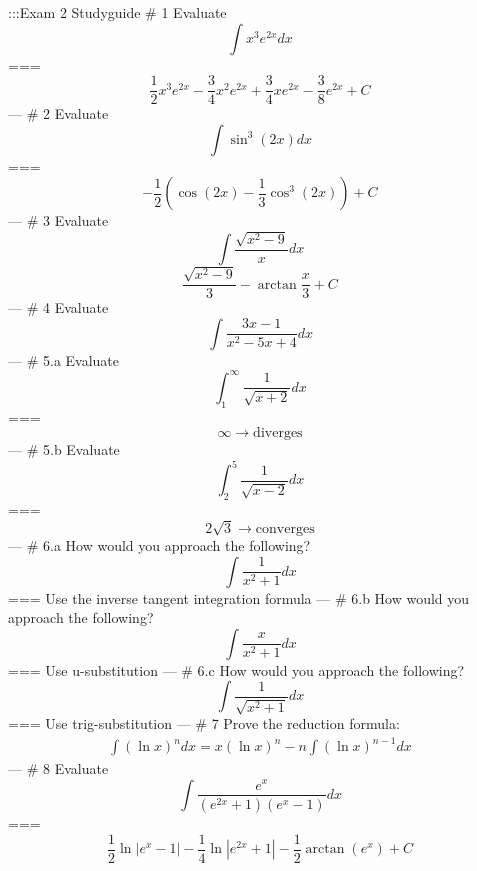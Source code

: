 :::Exam 2 Studyguide
# 1
Evaluate
\[\int x^3 e^{2x}dx\]
===
\[\frac{1}{2}x^3e^{2x}-\frac{3}{4}x^2e^{2x}+\frac{3}{4}xe^{2x}-\frac{3}{8}e^{2x}+C\]
---
# 2
Evaluate
\[\int\sin^3(2x)dx\]
===
\[-\frac{1}{2}\left(\cos(2x)-\frac{1}{3}\cos^3(2x)\right)+C\]
---
# 3
Evaluate
\[\int\frac{\sqrt{x^2-9}}{x}dx\]
\[\frac{\sqrt{x^2-9}}{3}-\arctan\frac{x}{3}+C\]
---
# 4
Evaluate
\[\int\frac{3x-1}{x^2-5x+4}dx\]
---
# 5.a
Evaluate
\[\int_1^\infty\frac{1}{\sqrt{x+2}}dx\]
===
\[\infty\rightarrow\text{diverges}\]
---
# 5.b
Evaluate
\[\int_2^5\frac{1}{\sqrt{x-2}}dx\]
===
\[2\sqrt{3}\rightarrow\text{converges}\]
---
# 6.a
How would you approach the following?
\[\int\frac{1}{x^2+1}dx\]
===
Use the inverse tangent integration formula
---
# 6.b
How would you approach the following?
\[\int\frac{x}{x^2+1}dx\]
===
Use u-substitution
---
# 6.c
How would you approach the following?
\[\int\frac{1}{\sqrt{x^2+1}}dx\]
===
Use trig-substitution
---
# 7
Prove the reduction formula:
\begin{gather*}
\int(\ln x)^n dx=x(\ln x)^n-n\int(\ln x)^{n-1}dx
\end{gather*}
---
# 8
Evaluate
\[\int\frac{e^x}{(e^{2x}+1)(e^x-1)}dx\]
===
\[\frac{1}{2}\ln|e^x-1|-\frac{1}{4}\ln|e^{2x}+1|-\frac{1}{2}\arctan\left(e^x\right)+C\]
